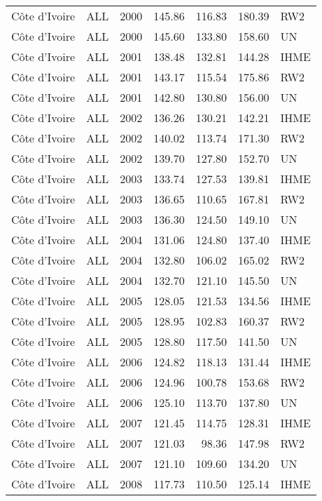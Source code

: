 \begin{longtable}{lllrrrl}
  C\^{o}te d'Ivoire & ALL & 2000 & 145.86 & 116.83 & 180.39 & RW2 \\ 
  C\^{o}te d'Ivoire & ALL & 2000 & 145.60 & 133.80 & 158.60 & UN \\ 
  C\^{o}te d'Ivoire & ALL & 2001 & 138.48 & 132.81 & 144.28 & IHME \\ 
  C\^{o}te d'Ivoire & ALL & 2001 & 143.17 & 115.54 & 175.86 & RW2 \\ 
  C\^{o}te d'Ivoire & ALL & 2001 & 142.80 & 130.80 & 156.00 & UN \\ 
  C\^{o}te d'Ivoire & ALL & 2002 & 136.26 & 130.21 & 142.21 & IHME \\ 
  C\^{o}te d'Ivoire & ALL & 2002 & 140.02 & 113.74 & 171.30 & RW2 \\ 
  C\^{o}te d'Ivoire & ALL & 2002 & 139.70 & 127.80 & 152.70 & UN \\ 
  C\^{o}te d'Ivoire & ALL & 2003 & 133.74 & 127.53 & 139.81 & IHME \\ 
  C\^{o}te d'Ivoire & ALL & 2003 & 136.65 & 110.65 & 167.81 & RW2 \\ 
  C\^{o}te d'Ivoire & ALL & 2003 & 136.30 & 124.50 & 149.10 & UN \\ 
  C\^{o}te d'Ivoire & ALL & 2004 & 131.06 & 124.80 & 137.40 & IHME \\ 
  C\^{o}te d'Ivoire & ALL & 2004 & 132.80 & 106.02 & 165.02 & RW2 \\ 
  C\^{o}te d'Ivoire & ALL & 2004 & 132.70 & 121.10 & 145.50 & UN \\ 
  C\^{o}te d'Ivoire & ALL & 2005 & 128.05 & 121.53 & 134.56 & IHME \\ 
  C\^{o}te d'Ivoire & ALL & 2005 & 128.95 & 102.83 & 160.37 & RW2 \\ 
  C\^{o}te d'Ivoire & ALL & 2005 & 128.80 & 117.50 & 141.50 & UN \\ 
  C\^{o}te d'Ivoire & ALL & 2006 & 124.82 & 118.13 & 131.44 & IHME \\ 
  C\^{o}te d'Ivoire & ALL & 2006 & 124.96 & 100.78 & 153.68 & RW2 \\ 
  C\^{o}te d'Ivoire & ALL & 2006 & 125.10 & 113.70 & 137.80 & UN \\ 
  C\^{o}te d'Ivoire & ALL & 2007 & 121.45 & 114.75 & 128.31 & IHME \\ 
  C\^{o}te d'Ivoire & ALL & 2007 & 121.03 & 98.36 & 147.98 & RW2 \\ 
  C\^{o}te d'Ivoire & ALL & 2007 & 121.10 & 109.60 & 134.20 & UN \\ 
  C\^{o}te d'Ivoire & ALL & 2008 & 117.73 & 110.50 & 125.14 & IHME \\ 

\end{longtable}
